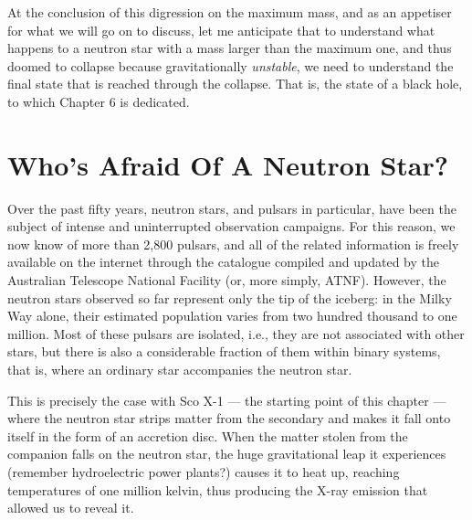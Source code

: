 At the conclusion of this digression on the maximum mass, and as an appetiser for what
we will go on to discuss, let me anticipate that to understand what happens to a neutron
star with a mass larger than the maximum one, and thus doomed to collapse
because gravitationally \emph{unstable}, we need
to understand the final state that is reached through the collapse. That is, the state
of a black hole, to which Chapter 6 is dedicated.

\section{Who's Afraid Of A Neutron Star?}\label{sec:05-danger}

Over the past fifty years, neutron stars, and pulsars in particular, have been the
subject of intense and uninterrupted observation campaigns. For this reason, we now know
of more than 2,800 pulsars, and all of the related information is freely available on
the internet through the catalogue compiled and updated by the Australian Telescope
National Facility (or, more simply, ATNF). However, the neutron stars observed so far
represent only the tip of the iceberg: in the Milky Way alone, their
estimated population varies from two hundred thousand to one million. Most of these
pulsars are isolated, i.e., they are not associated with other stars, but there is also
a considerable fraction of them within binary systems, that is, where an ordinary star
accompanies the neutron star.

This is precisely the case with Sco X-1 --- the starting point of
this chapter --- where the neutron star strips matter from the secondary and makes it
fall onto itself in the form of an accretion disc. When the matter
stolen from the companion falls on the neutron star, the huge gravitational leap it
experiences (remember hydroelectric power plants?) causes it to heat up, reaching
temperatures of one million kelvin, thus producing the X-ray emission
that allowed us to reveal it.

